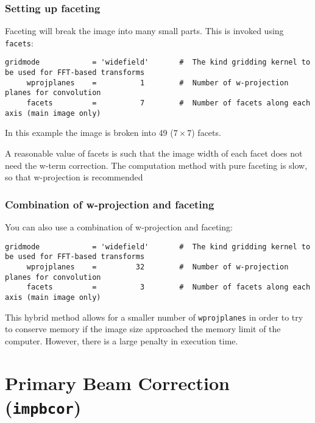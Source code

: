 \subsubsection{Setting up faceting}
\label{section:im.clean.widefieldfacet}

Faceting will break the image into many small parts.  This
is invoked using {\tt facets}:
\small
\begin{verbatim}
gridmode            = 'widefield'       #  The kind gridding kernel to be used for FFT-based transforms
     wprojplanes    =          1        #  Number of w-projection planes for convolution
     facets         =          7        #  Number of facets along each axis (main image only)
\end{verbatim}
\normalsize
In this example the image is broken into 49 ($7\times7$) facets.

A reasonable value of facets is such that the image width of each facet
does not need the w-term correction.  The computation method with pure
faceting is slow, so that w-projection is recommended

\subsubsection{Combination of w-projection and faceting}
\label{section:im.clean.widefield.combo}

You can also use a combination of w-projection and faceting:
\small
\begin{verbatim}
gridmode            = 'widefield'       #  The kind gridding kernel to be used for FFT-based transforms
     wprojplanes    =         32        #  Number of w-projection planes for convolution
     facets         =          3        #  Number of facets along each axis (main image only)
\end{verbatim}
\normalsize
This hybrid method allows for a smaller number of {\tt wprojplanes} in order
to try to conserve memory if the image size approached the memory limit
of the computer.  However, there is a large penalty in execution time.


\section{Primary Beam Correction ({\tt impbcor})}
\label{section:im.impbcor}

